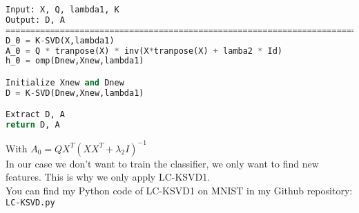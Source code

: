 \vspace{0.5cm}
\begin{lstlisting}[language=Python,frame=single]
Input: X, Q, lambda1, K
Output: D, A
===========================================================================
D_0 = K-SVD(X,lambda1)
A_0 = Q * tranpose(X) * inv(X*tranpose(X) + lamba2 * Id)
h_0 = omp(Dnew,Xnew,lambda1)

Initialize Xnew and Dnew
D = K-SVD(Dnew,Xnew,lambda1)

Extract D, A
return D, A
\end{lstlisting}
\vspace{0.5cm}
With $A_0 = Q X^T (XX^T + \lambda_2 I)^{-1}$
\vspace{0.5cm}\\
In our case we don't want to train the classifier, we only want to find new features. This is why we only apply LC-KSVD1.\\
You can find my Python code of  LC-KSVD1 on MNIST in my Github repository: \texttt{LC-KSVD.py}
